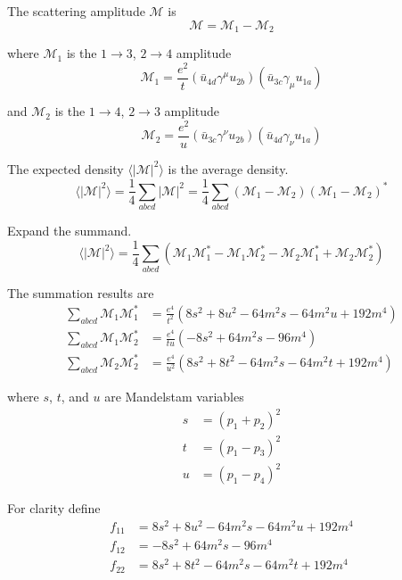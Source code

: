 The scattering amplitude $\mathcal M$ is
\begin{equation*}
\mathcal M=\mathcal M_1-\mathcal M_2
\end{equation*}

where $\mathcal M_1$ is the $1\rightarrow3$, $2\rightarrow4$ amplitude
\begin{equation*}
\mathcal M_1=\frac{e^2}{t}
(\bar{u}_{4d}\gamma^\mu u_{2b})
(\bar{u}_{3c}\gamma_\mu u_{1a})
\end{equation*}

and $\mathcal M_2$ is the $1\rightarrow4$, $2\rightarrow3$ amplitude
\begin{equation*}
\mathcal M_2=\frac{e^2}{u}
(\bar{u}_{3c}\gamma^\nu u_{2b})
(\bar{u}_{4d}\gamma_\nu u_{1a})
\end{equation*}

The expected density $\langle|\mathcal M|^2\rangle$ is the average density.
\begin{equation*}
\langle|\mathcal M|^2\rangle
=\frac{1}{4}\sum_{abcd}|\mathcal M|^2
=\frac{1}{4}\sum_{abcd}(\mathcal M_1-\mathcal M_2)(\mathcal M_1-\mathcal M_2)^*
\end{equation*}

Expand the summand.
\begin{equation*}
\langle|\mathcal{M}|^2\rangle=\frac{1}{4}
\sum_{abcd}
\left(
\mathcal M_1\mathcal M_1^*-
\mathcal M_1\mathcal M_2^*-
\mathcal M_2\mathcal M_1^*+
\mathcal M_2\mathcal M_2^*
\right)
\end{equation*}

The summation results are
\begin{align*}
\sum_{abcd}
\mathcal M_1\mathcal M_1^*&=\frac{e^4}{t^2}
\left(8 s^2 + 8 u^2 - 64 m^2 s - 64 m^2 u + 192 m^4\right)
\\
\sum_{abcd}
\mathcal M_1\mathcal M_2^*&=\frac{e^4}{tu}
\left(-8 s^2 + 64 m^2 s - 96 m^4\right)
\\
\sum_{abcd}
\mathcal M_2\mathcal M_2^*&=\frac{e^4}{u^2}
\left(8 s^2 + 8 t^2 - 64 m^2 s - 64 m^2 t + 192 m^4\right)
\end{align*}

where $s$, $t$, and $u$ are Mandelstam variables
\begin{align*}
s&=(p_1+p_2)^2
\\
t&=(p_1-p_3)^2
\\
u&=(p_1-p_4)^2
\end{align*}

For clarity define
\begin{align*}
f_{11}&=8 s^2 + 8 u^2 - 64 m^2 s - 64 m^2 u + 192 m^4
\\
f_{12}&=-8 s^2 + 64 m^2 s - 96 m^4
\\
f_{22}&=8 s^2 + 8 t^2 - 64 m^2 s - 64 m^2 t + 192 m^4
\end{align*}


